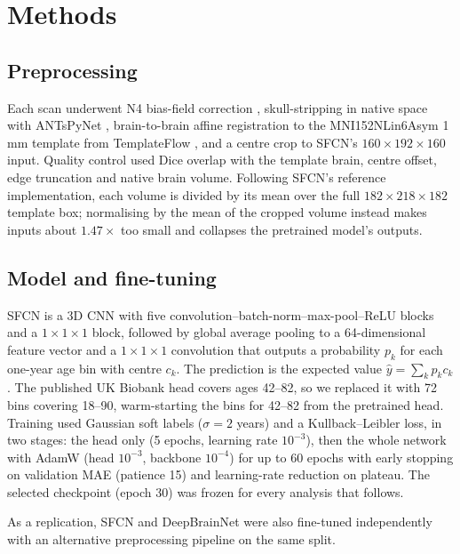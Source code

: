 \documentclass[conference]{IEEEtran}
\begin{document}
\section{Methods}
\subsection{Preprocessing}
Each scan underwent N4 bias-field correction \cite{tustison2010n4}, skull-stripping in native space with ANTsPyNet \cite{tustison2021antsx}, brain-to-brain affine registration to the MNI152NLin6Asym 1\,mm template from TemplateFlow \cite{ciric2022templateflow}, and a centre crop to SFCN's $160\times192\times160$ input. Quality control used Dice overlap with the template brain, centre offset, edge truncation and native brain volume. Following SFCN's reference implementation, each volume is divided by its mean over the full $182\times218\times182$ template box; normalising by the mean of the cropped volume instead makes inputs about $1.47\times$ too small and collapses the pretrained model's outputs.

\subsection{Model and fine-tuning}
SFCN \cite{peng2021sfcn} is a 3D CNN with five convolution--batch-norm--max-pool--ReLU blocks and a $1\times1\times1$ block, followed by global average pooling to a 64-dimensional feature vector and a $1\times1\times1$ convolution that outputs a probability $p_k$ for each one-year age bin with centre $c_k$. The prediction is the expected value $\hat{y}=\sum_k p_k c_k$. The published UK Biobank head covers ages 42--82, so we replaced it with 72 bins covering 18--90, warm-starting the bins for 42--82 from the pretrained head. Training used Gaussian soft labels ($\sigma=2$ years) and a Kullback--Leibler loss, in two stages: the head only (5 epochs, learning rate $10^{-3}$), then the whole network with AdamW \cite{loshchilov2019adamw} (head $10^{-3}$, backbone $10^{-4}$) for up to 60 epochs with early stopping on validation MAE (patience 15) and learning-rate reduction on plateau. The selected checkpoint (epoch 30) was frozen for every analysis that follows.

As a replication, SFCN and DeepBrainNet \cite{bashyam2020dbn} were also fine-tuned independently with an alternative preprocessing pipeline on the same split.
\end{document}
